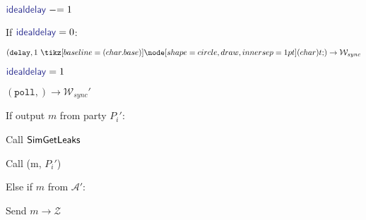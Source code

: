 \newcommand{\idealdelay}{{\color{Blue} \msf{idealdelay} }}

\begin{bbox}[title={Algorithm $\msf{Poll}$}]

\begin{renumerate}

  	\item $\idealdelay \minuseq 1$
  	
  	\item If $\idealdelay = 0$:
  	 
  		\quad \Send $(\texttt{delay}, 1 \token) \rightarrow \mathcal{W}_{sync}$

  		\quad $\idealdelay = 1$

  	\item \Send $(\texttt{poll},) \rightarrow \mathcal{W}_{sync}'$
 
  	\item If output $m$ from party $P_i'$:

			\quad Call ${\mathsf {SimGetLeaks}}$

			\quad Call (m, $P_i'$)
		
		Else if $m$ from $\mathcal{A}'$:

			\quad Send $m \rightarrow \mathcal{Z}$

\end{renumerate}

\end{bbox}
